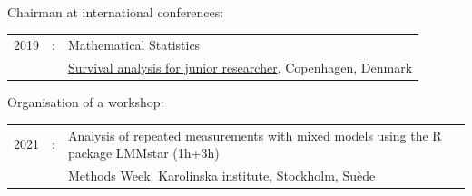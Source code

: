 \documentclass[12pt]{article}
\begin{document}
\bigskip

Chairman at international conferences:

\medskip

\begin{tabular}{l@{ }l@{ }l}
2019 &:& Mathematical Statistics \\
&& \href{https://publicifsv.sund.ku.dk/~safjr2019/}{Survival analysis for junior researcher}, Copenhagen, Denmark
\end{tabular}

\bigskip

Organisation of a workshop:
\begin{tabular}{l@{ }l@{ }l}
2021 &:& Analysis of repeated measurements with mixed models using the R package LMMstar (1h+3h) \\
&& Methods Week, Karolinska institute, Stockholm, Suède
\end{tabular}



\end{document}
